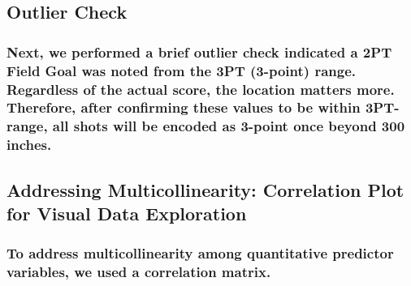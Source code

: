 \documentclass[]{article}
\begin{document}
\hypertarget{outlier-check}{%
\subsection{\texorpdfstring{\textbf{Outlier
Check}}{Outlier Check}}\label{outlier-check}}

\hypertarget{next-we-performed-a-brief-outlier-check-indicated-a-2pt-field-goal-was-noted-from-the-3pt-3-point-range.-regardless-of-the-actual-score-the-location-matters-more.-therefore-after-confirming-these-values-to-be-within-3pt-range-all-shots-will-be-encoded-as-3-point-once-beyond-300-inches.}{%
\subsubsection{Next, we performed a brief outlier check indicated a 2PT
Field Goal was noted from the 3PT (3-point) range. Regardless of the
actual score, the location matters more. Therefore, after confirming
these values to be within 3PT-range, all shots will be encoded as
3-point once beyond 300
inches.}\label{next-we-performed-a-brief-outlier-check-indicated-a-2pt-field-goal-was-noted-from-the-3pt-3-point-range.-regardless-of-the-actual-score-the-location-matters-more.-therefore-after-confirming-these-values-to-be-within-3pt-range-all-shots-will-be-encoded-as-3-point-once-beyond-300-inches.}}

\hypertarget{addressing-multicollinearity-correlation-plot-for-visual-data-exploration}{%
\subsection{\texorpdfstring{\textbf{Addressing Multicollinearity:
Correlation Plot for Visual Data
Exploration}}{Addressing Multicollinearity: Correlation Plot for Visual Data Exploration}}\label{addressing-multicollinearity-correlation-plot-for-visual-data-exploration}}

\hypertarget{to-address-multicollinearity-among-quantitative-predictor-variables-we-used-a-correlation-matrix.}{%
\subsubsection{To address multicollinearity among quantitative predictor
variables, we used a correlation
matrix.}\label{to-address-multicollinearity-among-quantitative-predictor-variables-we-used-a-correlation-matrix.}}
\end{document}
